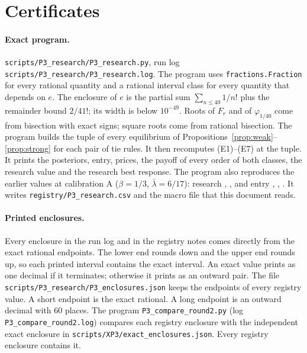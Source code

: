 \documentclass[12pt]{article}
\theoremstyle{definition}
\theoremstyle{remark}
\newcommand{\lb}{\bar\lambda}
\begin{document}
\section{Certificates}\label{sec:cert}

\paragraph{Exact program.} \texttt{scripts/P3\_research/P3\_research.py}, run log
\texttt{scripts/P3\_research/P3\_research.log}. The program uses \texttt{fractions.Fraction} for every rational
quantity and a rational interval class for every quantity that depends on $e$. The enclosure of $e$ is the partial
sum $\sum_{n\le40}1/n!$ plus the remainder bound $2/41!$; its width is below $10^{-49}$. Roots of $F_r$ and of
$\varphi_{1/40}$ come from bisection with exact signs; square roots come from rational bisection. The program
builds the tuple of every equilibrium of Propositions~\ref{prop:weak}--\ref{prop:strong} for each pair of tie rules.
It then recomputes (E1)--(E7) at the tuple. It prints the posteriors, entry, prices, the payoff of every order of
both classes, the research value and the research best response. The program also reproduces the earlier values at calibration A
($\beta=1/3$, $\lb=6/17$): research , , 
and entry , , .
It writes \texttt{registry/P3\_research.csv} and the macro file that this document reads.

\paragraph{Printed enclosures.} Every enclosure in the run log and in the registry notes comes directly from the
exact rational endpoints. The lower end rounds down and the upper end rounds up, so each printed interval contains
the exact interval. An exact value prints as one decimal if it terminates; otherwise it prints as an outward pair.
The file \texttt{scripts/P3\_research/P3\_enclosures.json} keeps the endpoints of every registry value. A short
endpoint is the exact rational. A long endpoint is an outward decimal with 60 places. The program
\texttt{P3\_compare\_round2.py} (log \texttt{P3\_compare\_round2.log}) compares each registry enclosure with the
independent exact enclosure in \texttt{scripts/XP3/exact\_enclosures.json}. Every registry enclosure contains it.
\end{document}
